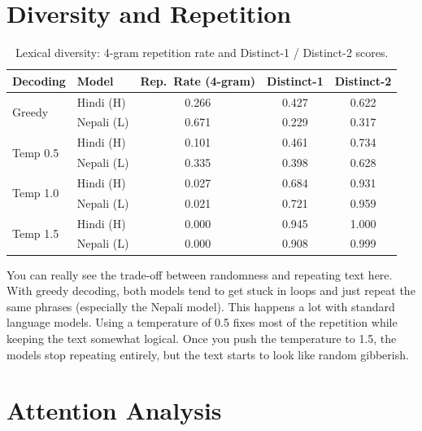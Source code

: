 \documentclass[11pt,a4paper]{article}
\begin{document}
\section{Diversity and Repetition}

\begin{table}[H]
\centering
\caption{Lexical diversity: 4-gram repetition rate and Distinct-1 / Distinct-2 scores.}
\label{tab:diversity}
\begin{tabular}{llccc}
\toprule
\textbf{Decoding} & \textbf{Model} & \textbf{Rep.\ Rate (4-gram)} & \textbf{Distinct-1} & \textbf{Distinct-2} \\
\midrule
\multirow{2}{*}{Greedy}   & Hindi (H)   & 0.266 & 0.427 & 0.622 \\
                           & Nepali (L)  & 0.671 & 0.229 & 0.317 \\
\midrule
\multirow{2}{*}{Temp 0.5} & Hindi (H)   & 0.101 & 0.461 & 0.734 \\
                           & Nepali (L)  & 0.335 & 0.398 & 0.628 \\
\midrule
\multirow{2}{*}{Temp 1.0} & Hindi (H)   & 0.027 & 0.684 & 0.931 \\
                           & Nepali (L)  & 0.021 & 0.721 & 0.959 \\
\midrule
\multirow{2}{*}{Temp 1.5} & Hindi (H)   & 0.000 & 0.945 & 1.000 \\
                           & Nepali (L)  & 0.000 & 0.908 & 0.999 \\
\bottomrule
\end{tabular}
\end{table}

You can really see the trade-off between randomness and repeating text here. With greedy decoding, both models tend to get stuck in loops and just repeat the same phrases (especially the Nepali model). This happens a lot with standard language models. Using a temperature of 0.5 fixes most of the repetition while keeping the text somewhat logical. Once you push the temperature to 1.5, the models stop repeating entirely, but the text starts to look like random gibberish.

\section{Attention Analysis}
\end{document}
